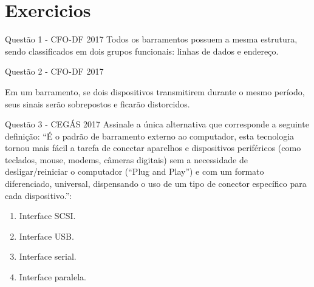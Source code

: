 \documentclass[aspectratio=169,
				xcolor=table]{beamer}
\begin{document}
	\section{Exercicios}
	
	\begin{frame}{Questão 1 - CFO-DF 2017}
		Todos os barramentos possuem a mesma estrutura, sendo classificados em dois grupos funcionais: linhas de dados e endereço.

	\end{frame}

	\begin{frame}{Questão 2 - CFO-DF 2017}

		Em um barramento, se dois dispositivos transmitirem durante o mesmo período, seus sinais serão sobrepostos e ficarão distorcidos.

	\end{frame}
	
	\begin{frame}{Questão 3 - CEGÁS 2017}
		Assinale a única alternativa que corresponde a seguinte definição: “É o padrão de barramento externo ao computador, esta tecnologia tornou mais fácil a tarefa de conectar aparelhos e dispositivos periféricos (como teclados, mouse, modems, câmeras digitais) sem a necessidade de desligar/reiniciar o computador (“Plug and Play”) e com um formato diferenciado, universal, dispensando o uso de um tipo de conector específico para cada dispositivo.”: 
		\begin{enumerate}[a]
			\item Interface SCSI.
			\item Interface USB.
			\item Interface serial. 
			\item Interface paralela. 
		
		\end{enumerate}
	\end{frame}
	
\end{document}
